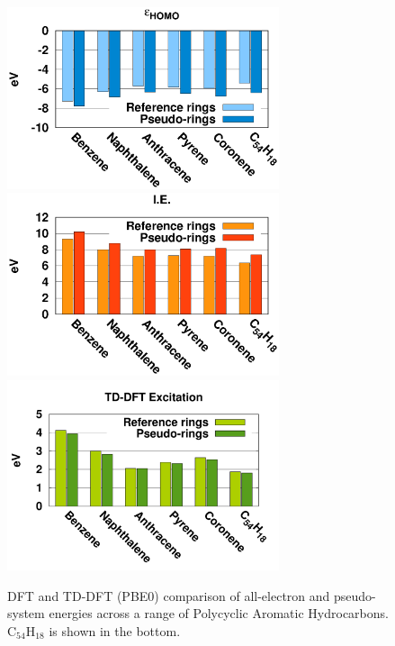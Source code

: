 \documentclass[12pt]{article}
\begin{document}
\begin{figure}
\begin{center}
\includegraphics[width=8cm]{ring_pbe0_homo_uhf}
\includegraphics[width=8cm]{ring_pbe0_ie_uhf}
\includegraphics[width=8cm]{ring_pbe0_tddft}
\end{center}
\vspace{0.25in}
\hspace*{3in}

\caption{DFT and TD-DFT (PBE0) comparison of all-electron and pseudo-system energies across a range of Polycyclic Aromatic Hydrocarbons. 
C\(_{54}\)H\(_{18}\) is shown in the bottom.}
\label{fig:rings_graphs}
\end{figure}
\end{document}

